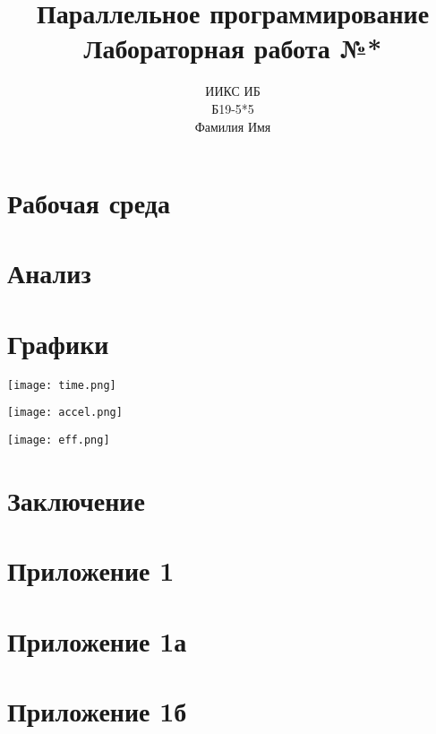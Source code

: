 \documentclass{article}
\title{Параллельное программирование\\Лабораторная работа №*}
\author{ИИКС ИБ\\Б19-5*5\\Фамилия Имя}
\date
\begin{document}
\maketitle
\newpage
\tableofcontents

\newpage
\section{Рабочая среда}


\newpage
\section{Анализ}


\newpage
\section{Графики}
\begin{minipage}{\linewidth}
    \texttt{[image: time.png]}
\end{minipage}
\begin{minipage}{0.48\linewidth}
    \texttt{[image: accel.png]}
\end{minipage}
\hfill
\begin{minipage}{0.49\linewidth}
    \texttt{[image: eff.png]}
\end{minipage}

\newpage
\section{Заключение}


\newpage
\section{Приложение 1}


\newpage
\section{Приложение 1а}


\newpage
\section{Приложение 1б}

\end{document}
